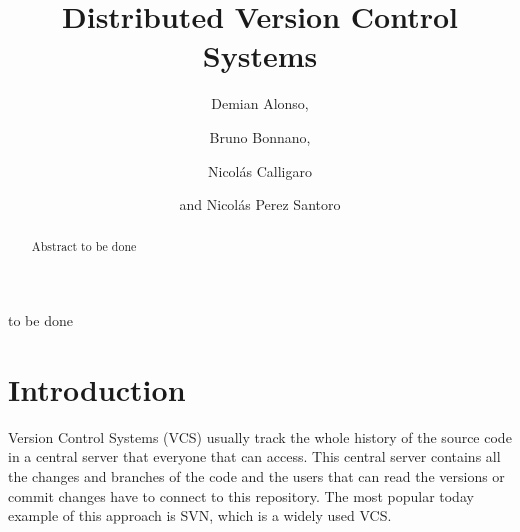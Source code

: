 \documentclass[%
	final,
	notitlepage,
	narroweqnarray,
	inline,
	twoside,
	]{ieee}
\begin{document}
\title[Distributed Version Control Systems]{%
       Distributed Version Control Systems}

\author[GRUPOAPIT]{Demian Alonso,
\and{} Bruno Bonnano,
\and{} Nicol\'{a}s Calligaro
\and{}and Nicol\'{a}s Perez Santoro
}



\maketitle               

\begin{abstract} 
Abstract to be done
\end{abstract}

\begin{keywords}
to be done
\end{keywords}

\section{Introduction}


\PARstart Version Control Systems (VCS) usually track the whole history of the
source code in a central server that everyone that can access. This 
central server contains all the changes and branches of the code and 
the users that can read the versions or commit changes have to connect 
to this repository. The most popular today example of this approach is SVN, which is a 
widely used VCS.
\end{document}
